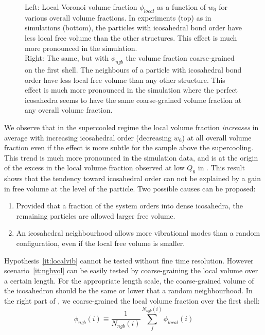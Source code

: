 \begin{figure}
	\centering
	\resizebox{\textwidth}{!}{}
	\caption{Left: Local Voronoi volume fraction $\phi_{local}$ as a function of $w_6$ for various overall volume fractions. In experiments (top) as in simulations (bottom), the particles with icosahedral bond order have less local free volume than the other structures. This effect is much more pronounced in the simulation.\\ Right: The same, but with $\phi_{ngb}$ the volume fraction coarse-grained on the first shell. The neighbours of a particle with icosahedral bond order have less local free volume than any other structure. This effect is much more pronounced in the simulation where the perfect icosahedra seems to have the same coarse-grained volume fraction at any overall volume fraction.}
	\label{fig:vol_w6}
\end{figure}

We observe that in the supercooled regime the local volume fraction \emph{increases} in average with increasing icosahedral order (decreasing $w_6$) at all overall volume fraction even if the effect is more subtle for the sample above the supercooling. This trend is much more pronounced in the simulation data, and is at the origin of the excess in the local volume fraction observed at low $Q_6$ in . This result shows that the tendency toward icosahedral order can not be explained by a gain in free volume at the level of the particle. Two possible causes can be proposed:
\begin{enumerate}
	\item\label{it:ngbvol} Provided that a fraction of the system orders into dense icosahedra, the remaining particles are allowed larger free volume.
	\item\label{it:localvib} An icosahedral neighbourhood allows more vibrational modes than a random configuration, even if the local free volume is smaller.
\end{enumerate}

Hypothesis~\ref{it:localvib} cannot be tested without fine time resolution. However scenario~\ref{it:ngbvol} can be easily tested by coarse-graining the local volume over a certain length. For the appropriate length scale, the coarse-grained volume of the icosahedron should be the same or lower that a random neighbourhood. In the right part of , we coarse-grained the local volume fraction over the first shell:
\begin{equation}
	\phi_{ngb}(i) \equiv \frac{1}{{N_{ngb}(i)}}\sum_j^{N_{ngb}(i)} \phi_{local}(i)
\end{equation}

